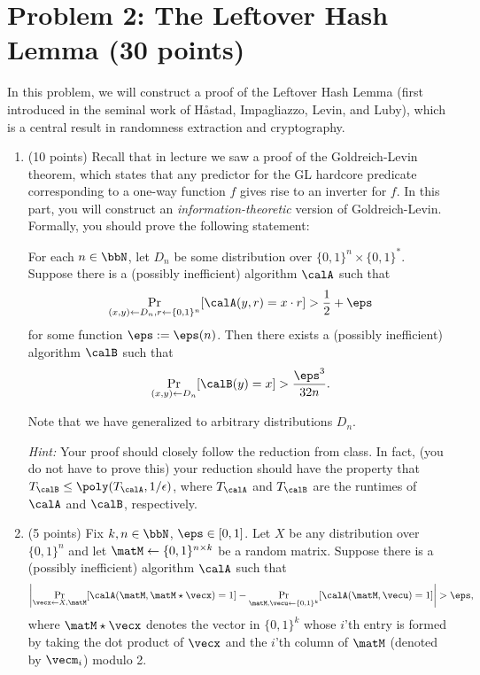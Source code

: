 \documentclass{article}
\begin{document}
\section*{Problem 2: The Leftover Hash Lemma (30 points)}
In this problem, we will construct a proof of the Leftover Hash Lemma (first introduced in the seminal work of H{\aa}stad, Impagliazzo, Levin, and Luby), which is a central result in randomness extraction and cryptography. 
\begin{enumerate}
    \item (10 points) Recall that in lecture we saw a proof of the Goldreich-Levin theorem, which states that any predictor for the GL hardcore predicate corresponding to a one-way function $f$ gives rise to an inverter for $f$. In this part, you will construct an \emph{information-theoretic} version of Goldreich-Levin. Formally, you should prove the following statement:
    \begin{theorem}
        For each $n \in \bbN$, let $D_n$ be some distribution over $\{0, 1\}^n \times \{0, 1\}^{*}$. Suppose there is a (possibly inefficient) algorithm $\calA$ such that
            \[ \Pr_{(x, y) \gets D_n, r \gets \{0, 1\}^n}[\calA(y, r) = x \cdot r] > \frac{1}{2}+\eps \]
        for some function $\eps := \eps(n)$. Then there exists a (possibly inefficient) algorithm $\calB$ such that
            \[ \Pr_{(x, y) \gets D_n}[\calB(y) = x] > \frac{\eps^3}{32n}. \]
    \end{theorem}
    Note that we have generalized to arbitrary distributions $D_n$.
    
    \emph{Hint:} Your proof should closely follow the reduction from class. In fact, (you do not have to prove this) your reduction should have the property that $T_\calB \leq \poly(T_\calA, 1/\epsilon)$, where $T_\calA$ and $T_\calB$ are the runtimes of $\calA$ and $\calB$, respectively.
    \item (5 points) Fix $k, n \in \bbN$, $\eps \in [0, 1]$. Let $X$ be any distribution over $\{0, 1\}^n$ and let $\matM \gets \{0, 1\}^{n \times k}$ be a random matrix. Suppose there is a (possibly inefficient) algorithm $\calA$ such that
        \[ \left| \Pr_{\vecx \gets X, \matM}[\calA(\matM, \matM \star \vecx) = 1] - \Pr_{\matM, \vecu \gets \{0, 1\}^k}[\calA(\matM, \vecu) = 1] \right| > \eps, \]
    where $\matM \star \vecx$ denotes the vector in $\{0, 1\}^k$ whose $i$'th entry is formed by taking the dot product of $\vecx$ and the $i$'th column of $\matM$ (denoted by $\vecm_i$) modulo 2.
    

\end{enumerate}
\end{document}
